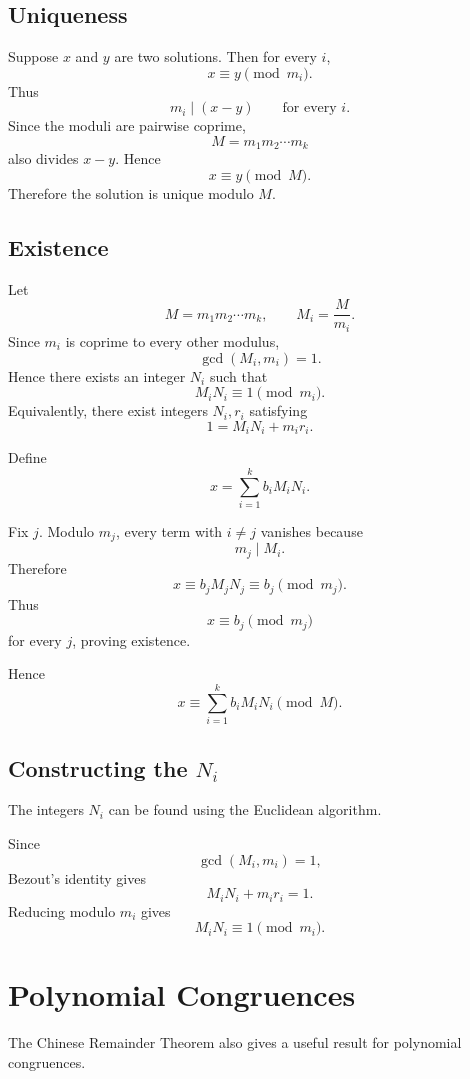 \documentclass[11pt]{article}
\theoremstyle{remark}
\DeclareMathOperator{\gcdop}{gcd}
\begin{document}
\subsection{Uniqueness}

Suppose $x$ and $y$ are two solutions. Then for every $i$,
\[
    x\equiv y\pmod{m_i}.
\]
Thus
\[
    m_i\mid(x-y)
    \qquad\text{for every }i.
\]
Since the moduli are pairwise coprime,
\[
    M=m_1m_2\cdots m_k
\]
also divides $x-y$. Hence
\[
    x\equiv y\pmod M.
\]
Therefore the solution is unique modulo $M$.

\subsection{Existence}

Let
\[
    M=m_1m_2\cdots m_k,
    \qquad
    M_i=\frac{M}{m_i}.
\]
Since $m_i$ is coprime to every other modulus,
\[
    \gcdop(M_i,m_i)=1.
\]
Hence there exists an integer $N_i$ such that
\[
    \boxed{
    M_iN_i\equiv1\pmod{m_i}.
    }
\]
Equivalently, there exist integers $N_i,r_i$ satisfying
\[
    \boxed{
    1=M_iN_i+m_ir_i.
    }
\]

Define
\[
    \boxed{
    x=\sum_{i=1}^k b_iM_iN_i.
    }
\]

Fix $j$. Modulo $m_j$, every term with $i\neq j$ vanishes because
\[
    m_j\mid M_i.
\]
Therefore
\[
    x
    \equiv
    b_jM_jN_j
    \equiv
    b_j
    \pmod{m_j}.
\]
Thus
\[
    x\equiv b_j\pmod{m_j}
\]
for every $j$, proving existence.

Hence
\[
    \boxed{
    x\equiv
    \sum_{i=1}^k b_iM_iN_i
    \pmod M
    }.
\]

\subsection{Constructing the $N_i$}

The integers $N_i$ can be found using the Euclidean algorithm.

Since
\[
    \gcdop(M_i,m_i)=1,
\]
Bezout's identity gives
\[
    M_iN_i+m_ir_i=1.
\]
Reducing modulo $m_i$ gives
\[
    M_iN_i\equiv1\pmod{m_i}.
\]

\section{Polynomial Congruences}

The Chinese Remainder Theorem also gives a useful result for polynomial
congruences.
\end{document}
